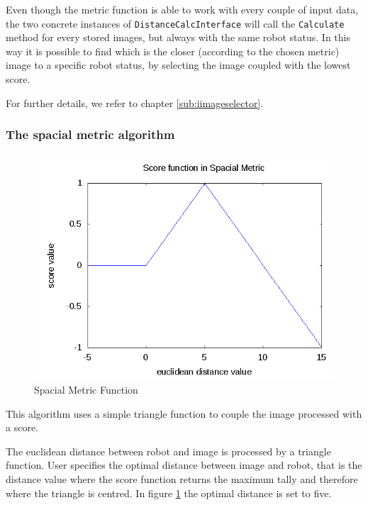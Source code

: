 %
Even though the metric function is able to work with every couple of input
data, the two concrete instances of \texttt{DistanceCalcInterface} will call
the \texttt{Calculate} method for every stored images, but always with the
same robot status. In this way it is possible to find which is the closer (according to the
chosen metric) image to a specific robot status, by selecting the image coupled with the lowest
score.
%

%
For further details, we refer to chapter \ref{sub:iimageselector}.




\subsubsection{The spacial metric algorithm}
\label{subsec:spacial_metric_algorithm}

\begin{figure}[!h]
  \begin{center}
    \includegraphics[width=400pt]{img/spacialMetricFunc.png} 
    \caption{Spacial Metric Function}
    \label{fig:spacial_metric_func}
  \end{center}
\end{figure}

This algorithm uses a simple triangle function to couple the image processed with a score.
%

%
The euclidean distance between robot and image is processed by a triangle function. User specifies
the optimal distance between image and robot, that is the distance value where
the score function returns the maximum tally and therefore where the triangle is centred.
In figure \ref{fig:spacial_metric_func} the optimal distance is set to five.
%

